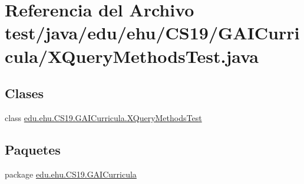 \hypertarget{a00011}{}\section{Referencia del Archivo test/java/edu/ehu/\+C\+S19/\+G\+A\+I\+Curricula/\+X\+Query\+Methods\+Test.java}
\label{a00011}
\subsection*{Clases}
\begin{DoxyCompactItemize}
\item 
class \mbox{\hyperlink{a00037}{edu.\+ehu.\+C\+S19.\+G\+A\+I\+Curricula.\+X\+Query\+Methods\+Test}}
\end{DoxyCompactItemize}
\subsection*{Paquetes}
\begin{DoxyCompactItemize}
\item 
package \mbox{\hyperlink{a00017}{edu.\+ehu.\+C\+S19.\+G\+A\+I\+Curricula}}
\end{DoxyCompactItemize}
